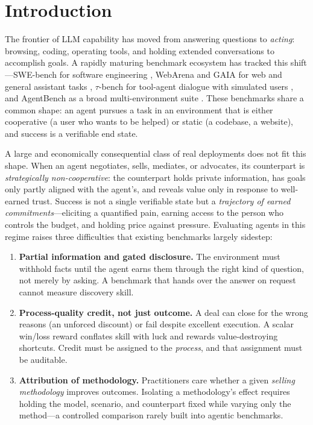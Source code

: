 \section{Introduction}
\label{sec:intro}

The frontier of LLM capability has moved from answering questions to
\emph{acting}: browsing, coding, operating tools, and holding extended
conversations to accomplish goals. A rapidly maturing benchmark ecosystem has
tracked this shift---SWE-bench for software engineering
\citep{jimenez2024swebench}, WebArena and GAIA for web and general assistant
tasks \citep{zhou2024webarena,mialon2023gaia}, $\tau$-bench for tool-agent
dialogue with simulated users \citep{yao2024taubench}, and AgentBench as a broad
multi-environment suite \citep{liu2023agentbench}. These benchmarks share a
common shape: an agent pursues a task in an environment that is either
cooperative (a user who wants to be helped) or static (a codebase, a website),
and success is a verifiable end state.

A large and economically consequential class of real deployments does not fit
this shape. When an agent negotiates, sells, mediates, or advocates, its
counterpart is \emph{strategically non-cooperative}: the counterpart holds
private information, has goals only partly aligned with the agent's, and reveals
value only in response to well-earned trust. Success is not a single verifiable
state but a \emph{trajectory of earned commitments}---eliciting a quantified
pain, earning access to the person who controls the budget, and holding price
against pressure. Evaluating agents in this regime raises three difficulties
that existing benchmarks largely sidestep:

\begin{enumerate}[leftmargin=1.4em,itemsep=2pt,topsep=2pt]
  \item \textbf{Partial information and gated disclosure.} The environment must
  withhold facts until the agent earns them through the right kind of question,
  not merely by asking. A benchmark that hands over the answer on request cannot
  measure discovery skill.
  \item \textbf{Process-quality credit, not just outcome.} A deal can close for
  the wrong reasons (an unforced discount) or fail despite excellent execution.
  A scalar win/loss reward conflates skill with luck and rewards value-destroying
  shortcuts. Credit must be assigned to the \emph{process}, and that assignment
  must be auditable.
  \item \textbf{Attribution of methodology.} Practitioners care whether a given
  \emph{selling methodology} improves outcomes. Isolating a methodology's effect
  requires holding the model, scenario, and counterpart fixed while varying only
  the method---a controlled comparison rarely built into agentic benchmarks.
\end{enumerate}

